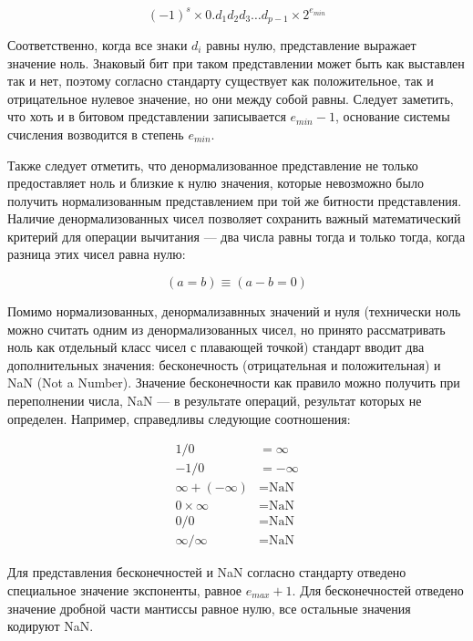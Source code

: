 \begin{equation}
    (-1)^s \times 0.d_{1}d_{2}d_{3}\ldots d_{p-1} \times 2^{e_{min}}
\end{equation}

Соответственно, когда все знаки $d_{i}$ равны нулю, представление выражает значение ноль.
Знаковый бит при таком представлении может быть как выставлен так и нет, поэтому согласно стандарту существует как положительное, так и отрицательное нулевое значение, но они между собой равны.
Следует заметить, что хоть и в битовом представлении записывается $e_{min} - 1$, основание системы счисления возводится в степень $e_{min}$.

Также следует отметить, что денормализованное представление не только предоставляет ноль и близкие к нулю значения, которые невозможно было получить нормализованным представлением при той же битности представления.
Наличие денормализованных чисел позволяет сохранить важный математический критерий для операции вычитания --- два числа равны тогда и только тогда, когда разница этих чисел равна нулю:

\begin{equation}
    (a = b) \equiv (a - b = 0)
\end{equation}

Помимо нормализованных, денормализавнных значений и нуля (технически ноль можно считать одним из денормализованных чисел, но принято рассматривать ноль как отдельный класс чисел с плавающей точкой) стандарт вводит два дополнительных значения: бесконечность (отрицательная и положительная) и \foreignlanguage{english}{NaN (Not a Number)}.
Значение бесконечности как правило можно получить при переполнении числа, NaN --- в результате операций, результат которых не определен.
Например, справедливы следующие соотношения:

\begin{align*}
    1 / 0 &= \infty \\
    -1 / 0 &= -\infty \\
    \infty + (- \infty) &= \text{NaN} \\
    0 \times \infty &= \text{NaN} \\
    0 / 0 &= \text{NaN} \\
    \infty / \infty &= \text{NaN}
\end{align*}

Для представления бесконечностей и NaN согласно стандарту отведено специальное значение экспоненты, равное $e_{max} + 1$.
Для бесконечностей отведено значение дробной части мантиссы равное нулю, все остальные значения кодируют NaN.

